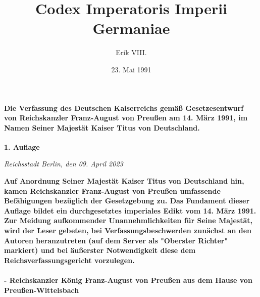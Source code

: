 \documentclass{article}
\title{Codex Imperatoris Imperii Germaniae}
\author{Erik VIII. }
\date{23. Mai 1991}
\begin{document}
\maketitle
\vspace*{\fill}
\paragraph{Die Verfassung des Deutschen Kaiserreichs gemäß Gesetzesentwurf von Reichskanzler Franz-August von Preußen am 14. März 1991, im Namen Seiner Majestät Kaiser Titus von Deutschland.}

\newpage
{}
\vspace*{\fill}
\begin{Center}
\textbf{1. Auflage}
\end{Center}
\begin{flushright}
\textit{Reichsstadt Berlin, den 09. April 2023}
\end{flushright}
\textbf{Auf Anordnung Seiner Majestät Kaiser Titus von Deutschland hin, kamen Reichskanzler Franz-August von Preußen umfassende Befähigungen bezüglich der Gesetzgebung zu. Das Fundament dieser Auflage bildet ein durchgesetztes imperiales Edikt vom 14. März 1991. Zur Meidung aufkommender Unannehmlichkeiten für Seine Majestät, wird der Leser gebeten, bei Verfassungsbeschwerden zunächst an den Autoren heranzutreten (auf dem Server als "Oberster Richter" markiert) und bei äußerster Notwendigkeit diese dem Reichsverfassungsgericht vorzulegen.}
\\\\
\textbf{- Reichskanzler König Franz-August von Preußen aus dem Hause von Preußen-Wittelsbach}
\\\\\\\\\\\\\\\\\\\\\\\\\\\\\\\\
\vspace*{\fill}
%
\newpage
\tableofcontents
\newpage
\end{document}
